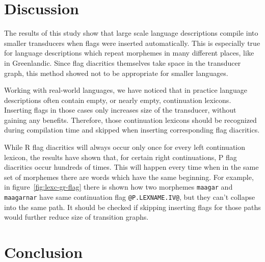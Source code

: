 \documentclass[11pt]{article}
\begin{document}
\section{Discussion}
\label{sec:discussion}

The results of this study show that large scale language descriptions compile into smaller transducers when flags were inserted automatically. This is especially true for language descriptions which repeat morphemes in many different places, like in Greenlandic. Since flag diacritics themselves take space in the transducer graph, this method showed not to be appropriate for smaller languages.

Working with real-world languages, we have noticed that in practice language descriptions often contain empty, or nearly empty, continuation lexicons. Inserting flags in those cases only increases size of the transducer, without gaining any benefits. Therefore, those continuation lexicons should be recognized during compilation time and skipped when inserting corresponding flag diacritics.

While R flag diacritics will always occur only once for every left continuation lexicon, the results have shown that, for certain right continuations, P flag diacritics occur hundreds of times. This will happen every time when in the same set of morphemes there are words which have the same beginning. For example, in figure~\ref{fig:lexc-gr-flag} there is shown how two morphemes \texttt{maagar} and \texttt{maagarnar} have same continuation flag \verb+@P.LEXNAME.IV@+, but they can't collapse into the same path. It should be checked if skipping inserting flags for those paths would further reduce size of transition graphs.






\section{Conclusion}
\label{sec:conclusion}
\end{document}
